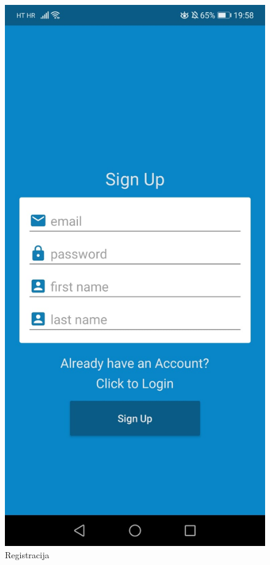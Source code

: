 \documentclass[times, utf8, zavrsni]{fer}
\begin{document}
\begin{figure}[!h]
  \includegraphics[width=1\textwidth]{./slike/app3}
	\caption{Registracija}
\label{fig:app2}
\endminipage\hfill
{}

\end{figure}
\end{document}
